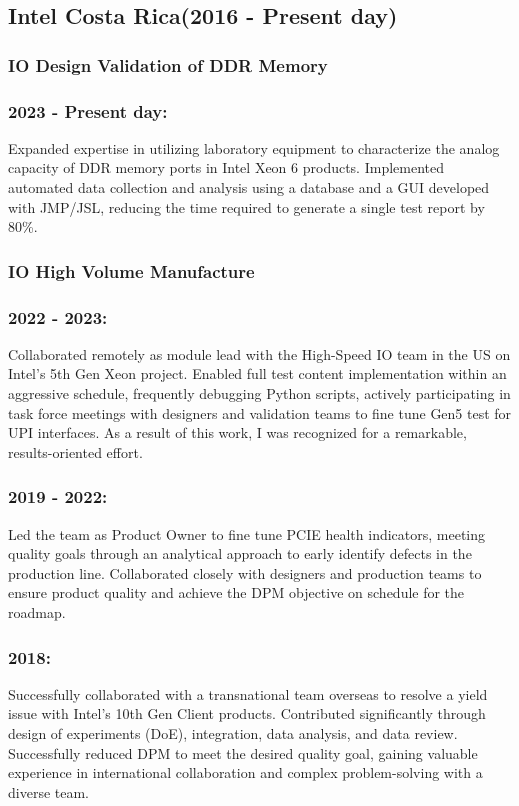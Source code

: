 \documentclass{article}
\begin{document}
\subsection{Intel Costa Rica(2016 - Present day)}
\subsubsection{IO Design Validation of DDR Memory}
\subsubsection{2023 - Present day:}
Expanded expertise in utilizing laboratory equipment to characterize the analog capacity of DDR memory ports in Intel Xeon 6 products. Implemented automated data collection and analysis using a database and a GUI developed with JMP/JSL, reducing the time required to generate a single test report by 80\%.
\subsubsection{IO High Volume Manufacture}
\subsubsection{2022 - 2023:}
Collaborated remotely as module lead with the High-Speed IO team in the US on Intel’s 5th Gen Xeon project. Enabled full test content implementation within an aggressive schedule, frequently debugging Python scripts, actively participating in task force meetings with designers and validation teams to fine tune Gen5 test for UPI interfaces. As a result of this work, I was recognized for a remarkable, results-oriented effort.
\subsubsection{2019 - 2022:}
Led the team as Product Owner to fine tune PCIE health indicators, meeting quality goals through an analytical approach to early identify defects in the production line. Collaborated closely with designers and production teams to ensure product quality and achieve the DPM objective on schedule for the roadmap.
\subsubsection{2018:}
Successfully collaborated with a transnational team overseas to resolve a yield issue with Intel’s 10th Gen Client products. Contributed significantly through design of experiments (DoE), integration, data analysis, and data review. Successfully reduced DPM to meet the desired quality goal, gaining valuable experience in international collaboration and complex problem-solving with a diverse team.
\end{document}
